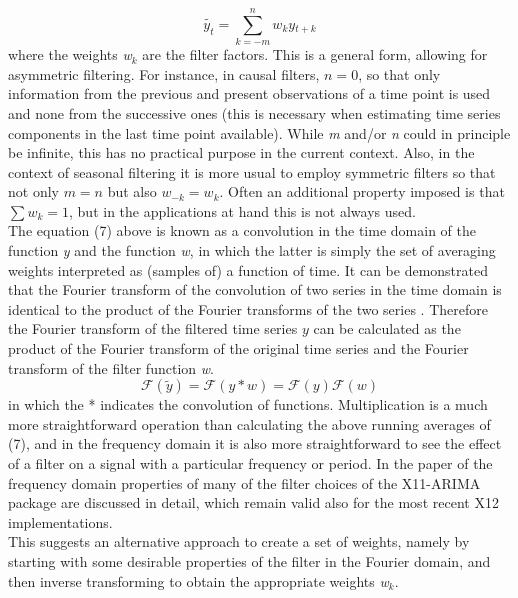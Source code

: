 \documentclass[english,blauw]{cbsdiscussionpaper}
\begin{document}
\begin{equation}
\tilde {y_t} = \sum\limits_{k=-m}^{n} \textit{w$_k$}\textit{y$_{t+k}$}
\end{equation}
where the weights \textit{w$_k$} are the filter factors. This is a general form, allowing for asymmetric filtering. For instance, in causal filters, $n=0$, so that only information from the previous and present observations of a time point is used and none from the successive ones (this is necessary when estimating time series components in the last time point available). While \textit{m} and/or \textit{n} could in principle be infinite, this has no practical purpose in the current context. Also, in the context of seasonal filtering it is more usual to employ symmetric filters so that not only $m=n$ but also $w_{-k} = w_k$. Often an additional property imposed is that $\sum w_k = 1$, but in the applications at hand this is not always used. \\ The equation (7) above is known as a convolution in the time domain of the function \textit{y} and the function \textit{w}, in which the latter is simply the set of averaging weights interpreted as (samples of) a function of time. It can be demonstrated that the Fourier transform of the convolution of two series in the time domain is identical to the product of the Fourier transforms of the two series \citep{bracewell1965}. Therefore the Fourier transform of the filtered time series $\textit{\~ y}$ can be calculated as the product of the Fourier transform of the original time series and the Fourier transform of the filter function \textit{w}.
\begin{equation}
\mathcal{F}(\tilde {y}) = \mathcal{F}(y * w) = \mathcal{F}(y)\mathcal{F}(w)
\end{equation}
in which the * indicates the convolution of functions. Multiplication is a much more straightforward operation than calculating the above running averages of (7), and in the frequency domain it is also more straightforward to see the effect of a filter on a signal with a particular frequency or period. In the paper of \citep{dageal1996} the frequency domain properties of many of the filter choices of the X11-ARIMA package are discussed in detail, which remain valid also for the most recent X12 implementations.\\ This suggests an alternative approach to create a set of weights, namely by starting with some desirable properties of the filter in the Fourier domain, and then inverse transforming to obtain the appropriate weights \textit{w$_k$}.\\
\end{document}
